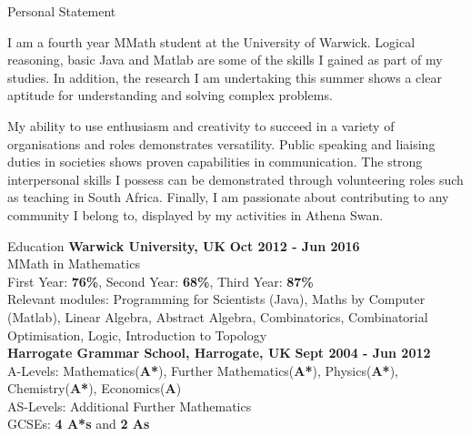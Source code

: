 \documentclass{resume} %
\begin{document}
\begin{rSection}{Personal Statement}
	
	
	
I am a fourth year MMath student at the University of Warwick. Logical reasoning, basic Java and Matlab are some of the skills I gained as part of my studies. In addition, the research I am undertaking this summer shows a clear aptitude for understanding and solving complex problems.
\item My ability to use enthusiasm and creativity to succeed in a variety of organisations and roles demonstrates versatility. Public speaking and liaising duties in societies shows proven capabilities in communication. The strong interpersonal skills I possess can be demonstrated through volunteering roles such as teaching in South Africa. Finally, I am passionate about contributing to any community I belong to, displayed by my activities in Athena Swan. 

\end{rSection}
\begin{rSection}{Education}
{\bf Warwick University, UK} \hfill {\bf Oct 2012 - Jun 2016} \\ 
MMath in Mathematics \\
First Year: {\bf 76\%}, 
Second Year: {\bf 68\%},
Third Year: {\bf 87\%} \\
Relevant modules: Programming for Scientists (Java), Maths by Computer (Matlab), Linear Algebra, Abstract Algebra, Combinatorics, Combinatorial Optimisation, Logic, Introduction to Topology
\medskip \\
{\bf Harrogate Grammar School, Harrogate, UK} \hfill {\bf Sept 2004 - Jun 2012} \\ 
A-Levels: Mathematics({\bf A*}), Further Mathematics({\bf A*}), Physics({\bf A*}), Chemistry({\bf A*}), Economics({\bf A})\\ 
AS-Levels: Additional Further Mathematics\\
GCSEs: {\bf 4 A*s} and {\bf 2 As}
\end{rSection}
\end{document}
